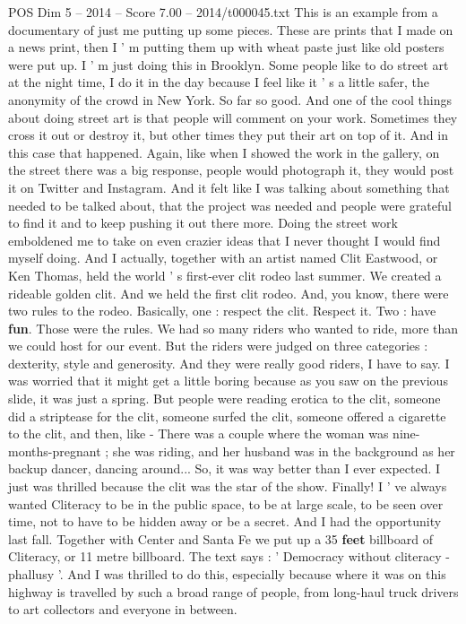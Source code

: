 \begin{textsample}{POS Dim 5 – 2014 – Score 7.00 – 2014/t000045.txt}
This is an example from a documentary of just me putting up some pieces.
These are prints that I made on a news print, then I ' m putting them up with wheat paste just like old posters were put up.
I ' m just doing this in Brooklyn.
Some people like to do street art at the night time, I do it in the day because I feel like it ' s a little safer, the anonymity of the crowd in New York.
So far so good.
And one of the cool things about doing street art is that people will comment on your work.
Sometimes they cross it out or destroy it, but other times they put their art on top of it.
And in this case that happened.
Again, like when I showed the work in the gallery, on the street there was a big response, people would photograph it, they would post it on Twitter and Instagram.
And it felt like I was talking about something that needed to be talked about, that the project was needed and people were grateful to find it and to keep pushing it out there more.
Doing the street work emboldened me to take on even crazier ideas that I never thought I would find myself doing.
And I actually, together with an artist named Clit Eastwood, or Ken Thomas, held the world ' s first-ever clit rodeo last summer.
We created a rideable golden clit.
And we held the first clit rodeo.
And, you know, there were two rules to the rodeo.
Basically, one : respect the clit.
Respect it.
Two : have \textbf{fun}.
Those were the rules.
We had so many riders who wanted to ride, more than we could host for our event.
But the riders were judged on three categories : dexterity, style and generosity.
And they were really good riders, I have to say.
I was worried that it might get a little boring because as you saw on the previous slide, it was just a spring.
But people were reading erotica to the clit, someone did a striptease for the clit, someone surfed the clit, someone offered a cigarette to the clit, and then, like - There was a couple where the woman was nine-months-pregnant ; she was riding, and her husband was in the background as her backup dancer, dancing around...
So, it was way better than I ever expected.
I just was thrilled because the clit was the star of the show.
Finally!
I ' ve always wanted Cliteracy to be in the public space, to be at large scale, to be seen over time, not to have to be hidden away or be a secret.
And I had the opportunity last fall.
Together with Center and Santa Fe we put up a 35 \textbf{feet} billboard of Cliteracy, or 11 metre billboard.
The text says : ' Democracy without cliteracy - phallusy '.
And I was thrilled to do this, especially because where it was on this highway is travelled by such a broad range of people, from long-haul truck drivers to art collectors and everyone in between.

\end{textsample}
